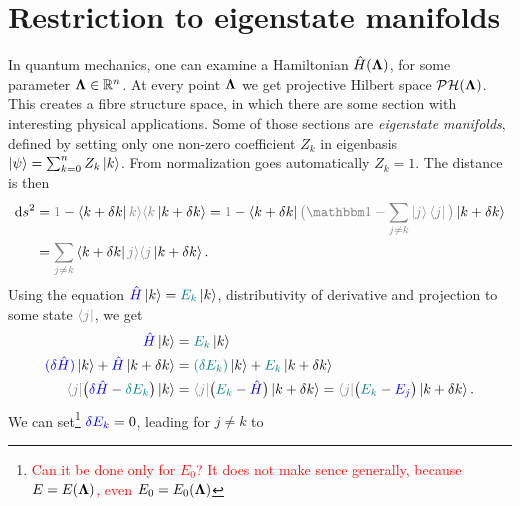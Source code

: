 \section{Restriction to eigenstate manifolds}
In quantum mechanics, one can examine a Hamiltonian $\hat{H}({\bm\Lambda})$, for some parameter ${\bm\Lambda}\in \mathbb{R}^n$. At every point ${\bm\Lambda}$ we get projective Hilbert space $\mathcal{PH}({\bm\Lambda})$. This creates a fibre structure space, in which there are some section with interesting physical applications. Some of those sections are \emph{eigenstate manifolds}, defined by setting only one non-zero coefficient $Z_k$ in eigenbasis $\ket{\psi}=\sum_{k=0}^n Z_k \ket{k}$. From normalization goes automatically $Z_k=1$. The distance is then
\begin{equation}
    \begin{split}
        \d s^2 &= \textcolor{gray}{1}-\bra{k+\delta k}\textcolor{gray}{k\rangle \langle k}\ket{k+\delta k}=\textcolor{gray}{1}-\bra{k+\delta k}\textcolor{gray}{\big(\Id-\sum_{j\neq k} \ket{j}\bra{j}\big)}\ket{k+\delta k} \\
        &= \textcolor{gray}{\sum_{j\neq k}}\bra{k+\delta k}\textcolor{gray}{j\rangle \langle j}\ket{k+\delta k}.
        \label{eq:dsDerivation}
    \end{split}
\end{equation}
Using the \Schrodinger equation $\textcolor{blue}{\hat{H}}\ket{k}=\textcolor{teal}{E_k} \ket{k}$, distributivity of derivative and projection to some state $\textcolor{gray}{\bra{j}}$, we get
\begin{equation}
    \begin{split}
        \textcolor{blue}{\HH}\ket{k} &= \textcolor{teal}{E_k}\ket{k}\\
        \textcolor{blue}{(\delta \HH)}\ket{k} +\textcolor{blue}{\HH}\ket{k+\delta k} &=\textcolor{teal}{(\delta E_k)}\ket{k} +\textcolor{teal}{E_k}\ket{k+\delta k}\\
         \textcolor{gray}{\bra{j}}\big(\textcolor{blue}{\delta \HH}-\textcolor{teal}{\delta E_k}\big)\ket{k}&=\textcolor{gray}{\bra{j}}\big(\textcolor{teal}{E_k}-\textcolor{blue}{\HH}\big)\ket{k+\delta k}=\textcolor{gray}{\bra{j}}\big(\textcolor{teal}{E_k}-\textcolor{blue}{E_j}\big)\ket{k+\delta k}.
    \end{split}
\end{equation}
We can set\footnote{\textcolor{red}{Can it be done only for $E_0$? It does not make sence generally, because $E=E({\bm\Lambda})$, even $E_0=E_0({\bm\Lambda})$}} $\textcolor{blue}{\delta E_k}=0$, leading for $j\neq k$ to
